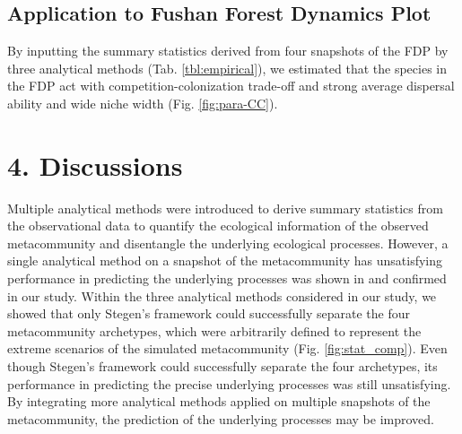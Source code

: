 \section{Application to Fushan Forest Dynamics Plot}
\noindent
By inputting the summary statistics derived from four snapshots of the FDP by three analytical methods (Tab. \ref{tbl:empirical}), we estimated that the species in the FDP act with competition-colonization trade-off and strong average dispersal ability and wide niche width (Fig. \ref{fig:para-CC}). 

%

\newpage
\chapter*{4. Discussions}
\setcounter{chapter}{4}
\noindent
Multiple analytical methods were introduced to derive \DIFdelbegin {}\DIFdelend summary statistics from the observational data to quantify the ecological information of the observed metacommunity and disentangle the underlying ecological processes. However, a single analytical method on a snapshot of the metacommunity has unsatisfying performance in predicting the underlying processes was shown in \citet{guzman2022accounting} and confirmed in our study. Within the three analytical methods considered in our study, we showed that only Stegen's framework could successfully separate the four metacommunity archetypes, which were arbitrarily defined to represent the extreme scenarios of the simulated metacommunity (Fig. \ref{fig:stat_comp}). Even though Stegen's framework could successfully separate the four archetypes, its performance in predicting the precise underlying processes was still unsatisfying. By integrating more analytical methods applied on multiple snapshots of the metacommunity, the prediction of the underlying processes may be improved. 

